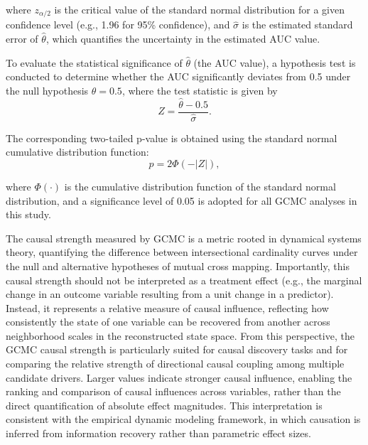 \documentclass[authoryear,preprint,review,12pt]{elsarticle}
\begin{document}
\noindent where \( z_{\alpha/2} \) is the critical value of the standard normal distribution for a given confidence level (e.g., 1.96 for 95\% confidence), and \(\hat{\sigma} \) is the estimated standard error of \(\hat{\theta}\), which quantifies the uncertainty in the estimated AUC value.

To evaluate the statistical significance of \(\hat{\theta}\) (the AUC value), a hypothesis test is conducted to determine whether the AUC significantly deviates from 0.5 under the null hypothesis \(\theta = 0.5\), where the test statistic is given by
\begin{equation}
Z = \frac{\hat{\theta} - 0.5}{\hat{\sigma}}.
\end{equation}

The corresponding two-tailed p-value is obtained using the standard normal cumulative distribution function:
\begin{equation}
p = 2 \Phi(-|Z|),
\end{equation}

\noindent where $\Phi(\cdot)$ is the cumulative distribution function of the standard normal distribution, and a significance level of 0.05 is adopted for all GCMC analyses in this study.

The causal strength measured by GCMC is a metric rooted in dynamical systems theory, quantifying the difference between intersectional cardinality curves under the null and alternative hypotheses of mutual cross mapping. Importantly, this causal strength should not be interpreted as a treatment effect (e.g., the marginal change in an outcome variable resulting from a unit change in a predictor). Instead, it represents a relative measure of causal influence, reflecting how consistently the state of one variable can be recovered from another across neighborhood scales in the reconstructed state space. From this perspective, the GCMC causal strength is particularly suited for causal discovery tasks and for comparing the relative strength of directional causal coupling among multiple candidate drivers. Larger values indicate stronger causal influence, enabling the ranking and comparison of causal influences across variables, rather than the direct quantification of absolute effect magnitudes. This interpretation is consistent with the empirical dynamic modeling framework, in which causation is inferred from information recovery rather than parametric effect sizes.
\end{document}
